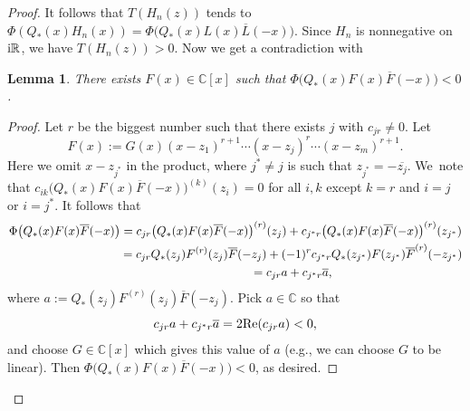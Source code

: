 \documentclass[pdftex]{sigma}
\newcommand{\RN}{\mathbb{R}} %
\newcommand{\CN}{\mathbb{C}} %
\newcommand{\ovl}{\overline}
\newtheorem{Lemma}[Theorem]{Lemma}
\theoremstyle{definition}
\numberwithin{equation}{section}
\begin{document}
\begin{proof}
It follows that $T(H_n(z))$ tends to $\Phi(Q_*(x)H_n(x))=\Phi\big(Q_*(x)L(x)\ovl{L}(-x)\big)$. Since $H_n$ is nonnegative on ${\rm i}\RN$, we have $T(H_n(z))>0$. Now we get a contradiction with
\begin{Lemma}
There exists $F(x)\in\CN[x]$ such that $\Phi\big(Q_*(x)F(x)\ovl{F}(-x)\big)<0$.
\end{Lemma}
\begin{proof}
Let $r$ be the biggest number such that there exists $j$ with $c_{jr}\neq 0$. Let
\[
F(x):=G(x)(x-z_1)^{r+1}\cdots(x-z_j)^{r}\cdots (x-z_m)^{r+1}.
\]
Here we omit $x-z_{{j^*}}$ in the product, where ${j^*}\ne j$ is such that $z_{{j^*}}=-\ovl{z_j}$. We~note that $c_{ik} \big(Q_*(x)F(x)\ovl{F}(-x)\big)^{(k)}(z_i)=0$ for all $i,k$ except $k=r$ and $i=j$ or $i={j^*}$. It follows that
\begin{gather*}
\Phi\big(Q_*(x)F(x)\ovl{F}(-x)\big)=
c_{jr}\big(Q_*(x)F(x)\ovl{F}(-x)\big)^{(r)}(z_j)+c_{{j^*}r} \big(Q_*(x)F(x)\ovl{F}(-x)\big)^{(r)}(z_{{j^*}})
\\ \hphantom{\Phi\big(Q_*(x)F(x)\ovl{F}(-x)\big)}
{}=c_{jr} Q_*(z_j)F^{(r)}(z_j)\ovl{F}(-z_j)+(-1)^r c_{{j^*}r}Q_*(z_{{j^*}})F(z_{{j^*}})\ovl{F}^{(r)}(-z_{{j^*}})
\\ \hphantom{\Phi\big(Q_*(x)F(x)\ovl{F}(-x)\big)}
{}=c_{jr}a+c_{{j^*}r}\ovl a,
\end{gather*}
where $a:= Q_*(z_{j})F^{(r)}(z_{j})\ovl{F}(-z_{j})$. Pick $a\in \mathbb C$ so that
\[
c_{jr}a+c_{{j^*}r}\ovl a=2{\rm Re}(c_{jr}a)<0,
\]
and choose
$G\in \CN[x]$ which gives this value of $a$ (e.g., we can choose $G$ to be linear).
Then $\Phi\big(Q_*(x)F(x)\ovl{F}(-x)\big)<0$, as desired.
\end{proof}
\renewcommand{\qed}{}
\end{proof}
\end{document}
